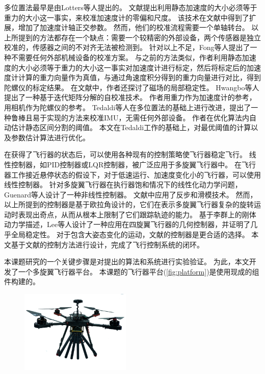 \documentclass[
  type=master
]{gdutthesis}
\begin{document}
多位置法最早是由Lotters等人提出的\cite{lotters1998procedure}。
文献\parencite{lotters1998procedure}提出利用静态加速度的大小必须等于重力的大小这一事实，来校准加速度计的零偏和尺度。
该技术在文献\parencite{syed2007new}中得到了扩展，增加了加速度计轴正交参数。
然而，他们的校准流程需要一个单轴转台。
以上所提到的方法都存在一个缺点：需要一个较精密的外部设备，两个传感器是独立校准的，传感器之间的不对齐无法被检测到。
针对以上不足，Fong等人提出了一种不需要任何外部机械设备的校准方案\cite{fong2008methods}。
与之前的方法类似，作者利用静态加速度的大小必须等于重力的大小这一事实对加速度计进行标定，然后将标定后的加速度计计算的重力向量作为真值，与通过角速度积分得到的重力向量进行对比，得到陀螺仪的标定结果。
在文献\parencite{cheuk2012automatic}中，作者还探讨了磁场的局部稳定性。
Hwangbo等人提出了一种基于迭代矩阵分解的自校准技术\cite{hwangbo2013imu}。
作者用重力作为加速度计的参考，用相机作为陀螺仪的参考。
Tedaldi等人在多位置法的基础上进行改进，提出了一种鲁棒且易于实现的方法来校准IMU，无需任何外部设备\cite{tedaldi2014robust}。
作者在优化算法内自动估计静态区间分割的阈值。
本文在Tedaldi工作的基础上，对最优阈值的计算以及参数估计算法进行优化。

在获得了飞行器的状态后，可以使用各种现有的控制策略使飞行器稳定飞行。
线性控制器，如PID控制器或LQR控制器，被广泛应用于多旋翼飞行器中\cite{hoffmann2007quadrotor,castillo2004stabilization,nice2004design}。
在飞行器工作接近悬停状态的假设下，对于低速运行、加速度变化小的飞行器，可以使用线性控制器。
针对多旋翼飞行器在执行器饱和情况下的线性化动力学问题，Guenard等人设计了一种非线性控制器\cite{guenard2005dynamic}。
文献\parencite{bouabdallah2005backstepping}中应用了反步和滑模技术。
然而，以上所提到的控制器是基于欧拉角设计的，它们在表示多旋翼飞行器复杂的旋转运动时表现出奇点，从而从根本上限制了它们跟踪轨迹的能力。
基于李群上的刚体动力学描述，Lee等人设计了一种应用在四旋翼飞行器的几何控制器，并证明了几乎全局稳定性\cite{lee2010geometric}。
对于包含大姿态变化的运动，文献\parencite{lee2010geometric}的控制器是更合适的选择。
本文基于文献\parencite{lee2010geometric}的控制方法进行设计，完成了飞行控制系统的闭环。

本课题研究的一个关键步骤是对提出的算法和系统进行实验验证。
为此，本文开发了一个多旋翼飞行器平台。
本课题的飞行器平台(\autoref{fig:platform})是使用现成的组件构建的。
\begin{figure}[H]
	\centering
	\includegraphics[width=0.47\textwidth]{platform.png}
	\label{fig:platform}
\end{figure} 
\end{document}
